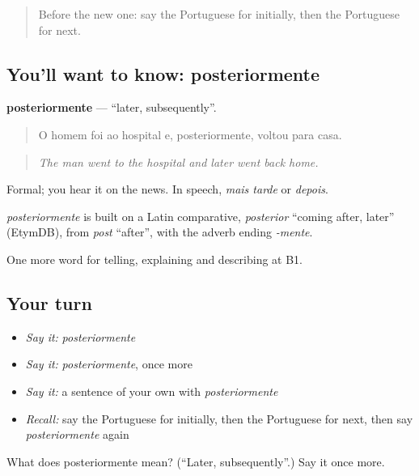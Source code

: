 \begin{quote}
Before the new one: say the Portuguese for initially, then the Portuguese for next.
\end{quote}

\subsection*{You'll want to know: posteriormente}
\textbf{posteriormente} — \textquotedblleft{}later, subsequently\textquotedblright{}.

\begin{quote}
O homem foi ao hospital e, posteriormente, voltou para casa.
\end{quote}

\begin{quote}
\emph{The man went to the hospital and later went back home.}
\end{quote}

Formal; you hear it on the news. In speech, \emph{mais tarde} or \emph{depois}.

\begin{cousinweb}
\emph{posteriormente} is built on a Latin comparative, \emph{posterior} \textquotedblleft{}coming after, later\textquotedblright{} (EtymDB), from \emph{post} \textquotedblleft{}after\textquotedblright{}, with the adverb ending \emph{-mente}.
\end{cousinweb}

\begin{grammarlens}[title={What you've built}]
One more word for telling, explaining and describing at B1.
\end{grammarlens}

\subsection*{Your turn}
\begin{itemize}
\raggedright
  \item \emph{Say it:} \emph{posteriormente}
  \item \emph{Say it:} \emph{posteriormente}, once more
  \item \emph{Say it:} a sentence of your own with \emph{posteriormente}
  \item \emph{Recall:} say the Portuguese for initially, then the Portuguese for next, then say \emph{posteriormente} again
\end{itemize}

\begin{tcolorbox}[breakable,colback=teal!4,colframe=teal!35!black,title={Before you move on}]
What does posteriormente mean? (\textquotedblleft{}Later, subsequently\textquotedblright{}.) Say it once more.
\end{tcolorbox}

